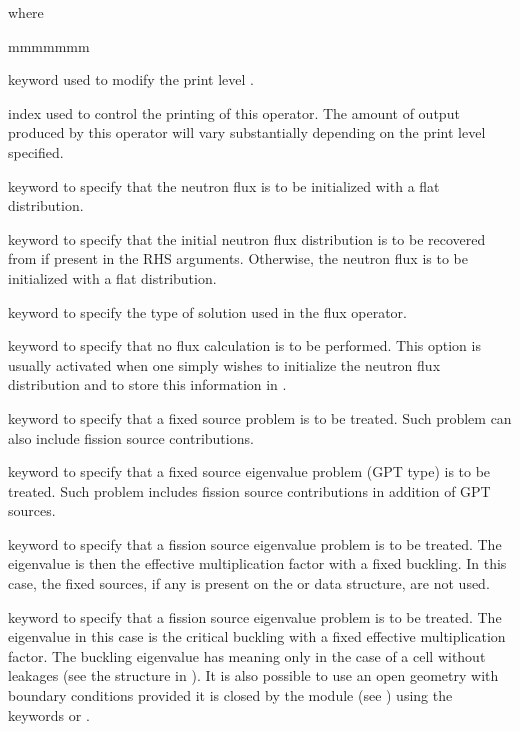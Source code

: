 \goodbreak
\noindent where
\begin{ListeDeDescription}{mmmmmmm}

\item[\moc{EDIT}] keyword used to modify the print level .

\item[\dusa{iprint}] index used to control the printing of this operator. The
amount of output produced by this operator will vary substantially
depending on the print level specified. 

\item[\moc{OFF}] keyword to specify that the neutron flux
is to be initialized with a flat distribution.

\item[\moc{ON}] keyword to specify that the initial neutron flux distribution
is to be recovered from  if present in the RHS arguments.
Otherwise, the neutron flux is to be initialized with a
flat distribution.

\item[\moc{TYPE}] keyword to specify the type of solution used in the flux
operator.

\item[\moc{N}] keyword to specify that no flux calculation is to be performed.
This option is usually activated when one simply wishes to initialize the
neutron flux distribution and to store this information in .

\item[\moc{S}]  keyword to specify that a fixed source problem is to be
treated. Such problem can also include fission source contributions.

\item[\moc{P}]  keyword to specify that a fixed source eigenvalue problem (GPT type) is to be
treated. Such problem includes fission source contributions in addition of GPT sources.

\item[\moc{K}] keyword to specify that a fission source eigenvalue problem is
to be treated. The eigenvalue is then the effective multiplication factor with a
fixed buckling. In this case, the fixed sources, if any is present on the
 or  data structure, are not used.  

\item[\moc{B}] keyword to specify that a fission source eigenvalue problem is
to be treated. The eigenvalue in this case is the critical buckling with a fixed
effective multiplication factor. The buckling eigenvalue has meaning only in the
case of a cell without leakages (see the structure  in
). It is also possible to use an open geometry with
 boundary conditions  provided it is closed by the  module
(see ) using the keywords  or .


\end{ListeDeDescription}

